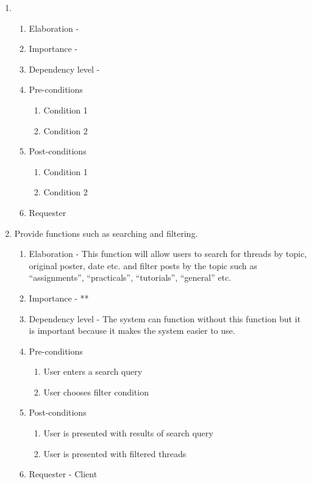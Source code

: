 \documentclass[12pt]{article}
\begin{document}
\begin{enumerate}
   \item  %
  \begin{enumerate}
    \item Elaboration - 
    \item Importance - 
    \item Dependency level - 
    \item Pre-conditions
    \begin{enumerate}
    	\item Condition 1
    	\item Condition 2
    \end{enumerate}
        \item Post-conditions
    \begin{enumerate}
    	\item Condition 1
    	\item Condition 2
    \end{enumerate}
    \item Requester
  \end{enumerate}
\clearpage %
\item Provide functions such as searching and filtering. %
  \begin{enumerate}
    \item Elaboration - This function will allow users to search for threads by topic, original poster, date etc. and filter posts by the topic such as “assignments”, “practicals”, “tutorials”, “general” etc.
    \item Importance - **
    \item Dependency level - The system can function without this function but it is important because it makes the system easier to use.
    \item Pre-conditions
    \begin{enumerate}
    	\item User enters a search query
    	\item User chooses filter condition
    \end{enumerate}
        \item Post-conditions
    \begin{enumerate}
    	\item User is presented with results of search query
    	\item User is presented with filtered threads
    \end{enumerate}
    \item Requester - Client

\end{enumerate}
\end{enumerate}
\end{document}
